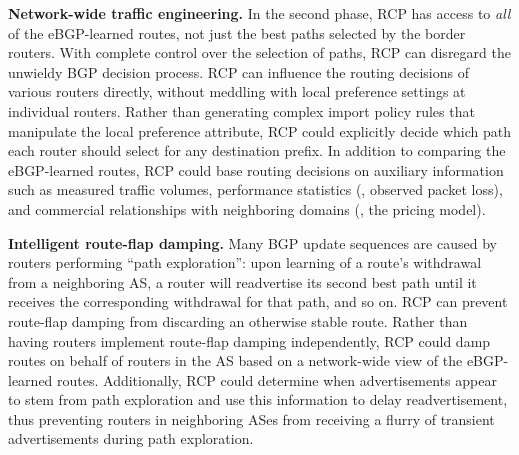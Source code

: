 {\bf Network-wide traffic engineering.}  In the second phase, RCP has
access to {\em all\/} of the eBGP-learned routes, not just the best
paths selected by the border routers.  With complete control over the
selection of paths, RCP can disregard the unwieldy BGP
decision process.  RCP can influence
the routing decisions of various routers directly, without 
meddling with local preference settings at individual routers.  Rather
than generating complex import policy rules that manipulate the
local preference attribute, RCP could explicitly decide which path
each router should select for any destination prefix.  In
addition to comparing the eBGP-learned routes, RCP could base routing
decisions on
auxiliary information such as measured traffic volumes, performance
statistics (\eg, observed packet loss), and commercial
relationships with neighboring domains (\eg, the pricing model).

{\bf Intelligent route-flap damping.}  Many BGP update sequences
are caused by routers performing ``path exploration'': upon learning of
a route's 
withdrawal from a neighboring AS, a router will readvertise its second
best path until it receives the corresponding withdrawal for that path, and
so on.  RCP can prevent route-flap damping from discarding an
otherwise stable route.  Rather than having routers implement route-flap
damping independently, RCP could damp routes on behalf of routers in
the AS based on a network-wide view of the eBGP-learned routes.
Additionally, RCP could determine when advertisements appear to stem
from path exploration and use this information to delay readvertisement,
thus preventing routers in neighboring ASes from receiving a flurry of
transient advertisements during path exploration.

